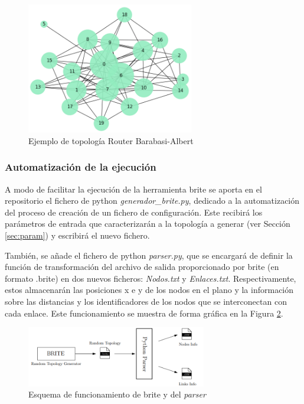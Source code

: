\begin{figure}[h!]
    \centering
    \includegraphics[width=0.65\textwidth]{img/diseno/barabasipy.PNG}
    \caption{Ejemplo de topología Router Barabasi-Albert}
    \label{fig:barabasipy}
\end{figure}

\vspace{3mm}

\subsubsection{Automatización de la ejecución}
\label{sec:brite_eje}

A modo de facilitar la ejecución de la herramienta \gls{brite} se aporta en el repositorio el fichero de python \textit{generador\_brite.py}, dedicado a la automatización del proceso de creación de un fichero de configuración. Este recibirá los parámetros de entrada que caracterizarán a la topología a generar (ver Sección \ref{sec:param}) y escribirá el nuevo fichero.

\vspace{3mm}

También, se añade el fichero de python \textit{parser.py}, que se encargará de definir la función de transformación del archivo de salida proporcionado por \gls{brite} (en formato .brite) en dos nuevos ficheros: \textit{Nodos.txt} y \textit{Enlaces.txt}. Respectivamente, estos almacenarán las posiciones x e y de los nodos en el plano y la información sobre las distancias y los identificadores de los nodos que se interconectan con cada enlace. Este funcionamiento se muestra de forma gráfica en la Figura \ref{fig:parser}.

\vspace{3mm}

\begin{figure}[H]
    \centering
    \includegraphics[width=0.7\textwidth]{img/teoria/parser.png}
    \caption{Esquema de funcionamiento de \acrshort{brite} y del \textit{parser} \cite{den2ne}}
    \label{fig:parser}
\end{figure}

